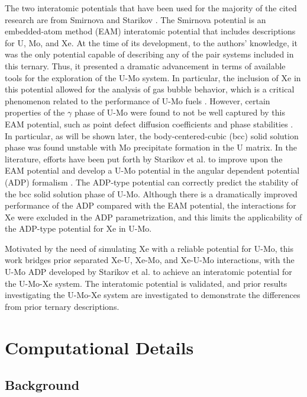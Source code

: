 \documentclass[review]{elsarticle}
\begin{document}
The two interatomic potentials that have been used for the majority of the cited research are from Smirnova \cite{smirnovaUMoXe} and Starikov \cite{starikov2018}. The Smirnova potential is an embedded-atom method (EAM) \cite{daw1984,daw1993} interatomic potential that includes descriptions for U, Mo, and Xe. At the time of its development, to the authors' knowledge, it was the only potential capable of describing any of the pair systems included in this ternary. Thus, it presented a dramatic advancement in terms of available tools for the exploration of the U-Mo system. In particular, the inclusion of Xe in this potential allowed for the analysis of gas bubble behavior, which is a critical phenomenon related to the performance of U-Mo fuels \cite{kim2013A,meyer2014}. However, certain properties of the $\gamma$ phase of U-Mo were found to not be well captured by this EAM potential, such as point defect diffusion coefficients and phase stabilities \cite{smirnovaUMoXe,starikov2018}. In particular, as will be shown later, the body-centered-cubic (bcc) solid solution phase was found unstable with Mo precipitate formation in the U matrix. In the literature, efforts have been put forth by Starikov et al. \cite{starikov2018} to improve upon the EAM potential and develop a U-Mo potential in the angular dependent potential (ADP) formalism \cite{mishin2005}. The ADP-type potential can correctly predict the stability of the bcc solid solution phase of U-Mo. Although there is a dramatically improved performance of the ADP compared with the EAM potential, the interactions for Xe were excluded in the ADP parametrization, and this limits the applicability of the ADP-type potential for Xe in U-Mo.

Motivated by the need of simulating Xe with a reliable potential for U-Mo, this work bridges prior separated Xe-U, Xe-Mo, and Xe-U-Mo interactions, with the U-Mo ADP developed by Starikov et al. \cite{starikov2018} to achieve an interatomic potential for the U-Mo-Xe system. The interatomic potential is validated, and prior results investigating the U-Mo-Xe system are investigated to demonstrate the differences from prior ternary descriptions.

\section{Computational Details}

\subsection{Background}
\end{document}
